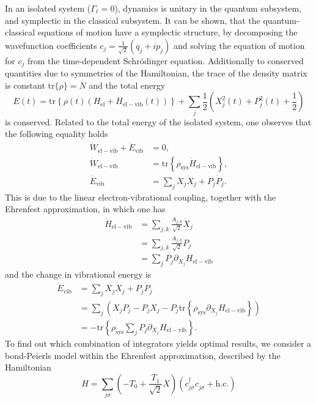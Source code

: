 \documentclass{article}
\newcommand{\pdagger}{{\phantom{\dagger}}}
\newcommand{\tr}[1]{\mathrm{tr}\left\{#1\right\}}
\begin{document}
In an isolated system ($\Gamma_\ell = 0$), dynamics is unitary in the quantum subsystem, and symplectic in the classical subsystem. It can be shown, that the quantum-classical equations of motion have a symplectic structure, by decomposing the wavefunction coefficients $c_j = \frac{1}{\sqrt{2}}(q_j+ip_j)$ and solving the equation of motion for $c_j$ from the time-dependent Schrödinger equation.
Additionally to conserved quantities due to symmetries of the Hamiltonian, the trace of the density matrix is constant $\mathrm{tr}\{\rho\}=N$ and the total energy 
\begin{equation*}
	E(t) = \tr{\rho(t)(H_\mathrm{el}+H_\mathrm{el-vib}(t))} + \sum_j \frac{1}{2}\left(X_j^2(t) + P_j^2(t) + \frac{1}{2}\right)
\end{equation*}
is conserved. 
Related to the total energy of the isolated system, one observes that the following equality holds
\begin{align*}
	\dot{W}_\mathrm{el-vib} + \dot{E}_\mathrm{vib} &= 0,\\
	\dot{W}_\mathrm{el-vib} &= \tr{\rho_\mathrm{sys}\dot{H}_\mathrm{el-vib}},\\
	\dot{E}_\mathrm{vib} &= \sum_{j}X_j\dot{X}_j+P_j\dot{P}_j.
\end{align*} 
This is due to the linear electron-vibrational coupling, together with the Ehrenfest approximation, in which one has
\begin{align*}
	\dot{H}_\mathrm{el-vib} &= \sum_{j,k}\frac{A_{j,k}}{\sqrt{2}}\dot{X}_j \\
	&= \sum_{j,k}\frac{A_{j,k}}{\sqrt{2}}P_j \\
	&= \sum_{j} P_j \partial_{X_j}H_\mathrm{el-vib}
\end{align*}
and the change in vibrational energy is 
\begin{align*}
	\dot{E}_\mathrm{vib} &= \sum_{j}X_j\dot{X}_j+P_j\dot{P}_j\\
	&= \sum_{j}(X_jP_j - P_jX_j - P_j\tr{\rho_\mathrm{sys}\partial_{X_j}H_\mathrm{el-vib}})\\
	&= -\tr{\rho_\mathrm{sys}\sum_j P_j \partial_{X_j}H_\mathrm{el-vib}}.
\end{align*}
To find out which combination of integrators yields optimal results, we consider a bond-Peierls model within the Ehrenfest approximation, described by the Hamiltonian
\begin{equation*}
	H =  \sum_{j\sigma}\left(-T_0 + \frac{T_1}{\sqrt{2}}X \right)(c_{j\sigma}^\dagger c_{j\sigma}^\pdagger + \mathrm{h.c.}) 
\end{equation*}
\end{document}
